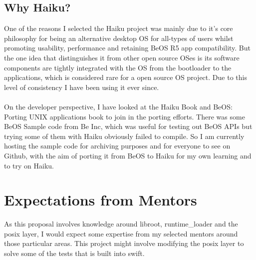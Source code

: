 \documentclass[12pt]{article}
\begin{document}
\subsection*{Why Haiku?}
One of the reasons I selected the Haiku project was mainly due to it's core philosophy for being an alternative desktop OS for all-types of users whilst promoting usability, performance and retaining BeOS R5 app compatibility. But the one idea that distinguishes it from other open source OSes is its software components are tightly integrated with the OS from the bootloader to the applications, which is considered rare for a open source OS project. Due to this level of consistency I have been using it ever since.
\\\\
On the developer perspective, I have looked at the Haiku Book and BeOS: Porting UNIX applications book to join in the porting efforts. There was some BeOS Sample code from Be Inc, which was useful for testing out BeOS APIs but trying some of them with Haiku obviously failed to compile. So I am currently hosting the sample code for archiving purposes and for everyone to see on Github, with the aim of porting it from BeOS to Haiku for my own learning and to try on Haiku.
\section*{Expectations from Mentors}
As this proposal involves knowledge around libroot, runtime\_loader and the posix layer, I would expect some expertise from my selected mentors around those particular areas. This project might involve modifying the posix layer to solve some of the tests that is built into swift.

\vspace{0.25cm}
\end{document}
